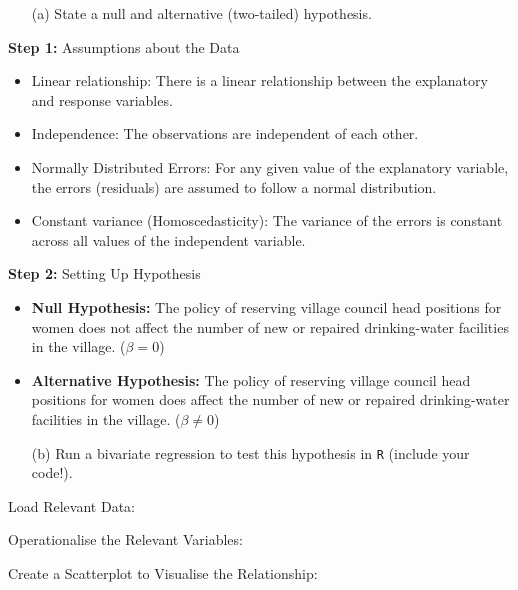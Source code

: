 \documentclass[12pt,letterpaper]{article}
\begin{document}
\newpage
\begin{enumerate}
	\item [(a)] State a null and alternative (two-tailed) hypothesis. 
\end{enumerate}
\noindent\textbf{Step 1:} Assumptions about the Data
\begin{itemize}
	\item 
	Linear relationship: There is a linear relationship between the explanatory  and response variables.
	\item
	Independence: The observations are independent of each other.
	\item 
	Normally Distributed Errors: For any given value of the explanatory variable, the errors (residuals) are assumed to follow a normal distribution.
	\item 
	Constant variance (Homoscedasticity): The variance of the errors is constant across all values of the independent variable.
\end{itemize}

\noindent\textbf{Step 2:} Setting Up Hypothesis
\begin{itemize}
	\item 
	\textbf{Null Hypothesis:} The policy of reserving village council head positions for women does not affect the number of new or repaired drinking-water facilities in the village. ($\beta = 0$)
	\item
	\textbf{Alternative Hypothesis:} The policy of reserving village council head positions for women does affect the number of new or repaired drinking-water facilities in the village. ($\beta \neq 0$)
\end{itemize}

\newpage
\begin{enumerate}
	\item [(b)] Run a bivariate regression to test this hypothesis in \texttt{R} (include your code!).
\end{enumerate}
\vspace{.5cm}
\noindent Load Relevant Data: 

\vspace{.5cm}
\noindent Operationalise the Relevant Variables:

\vspace{.5cm}
\noindent Create a Scatterplot to Visualise the Relationship: 

\end{document}
